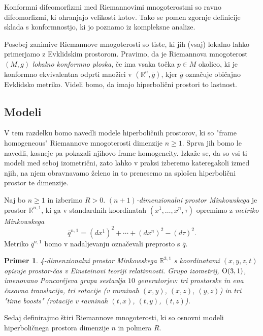 \documentclass[a4paper]{article}
\newtheorem{primer}{Primer}
\begin{document}
Konformni difeomorfizmi med Riemannovimi mnogoterostmi so ravno difeomorfizmi, ki ohranjajo velikosti kotov. Tako se pomen zgornje definicije sklada s konformnostjo, ki jo poznamo iz kompleksne analize.

Posebej zanimive Riemannove mnogoterosti so tiste, ki jih (vsaj) lokalno lahko primerjamo z Evklidskim prostorom. Pravimo, da je Riemannova mnogoterost $(M,g)$ \emph{lokalno konformno ploska}, če ima vsaka točka $p\in M$ okolico, ki je konformno ekvivalentna odprti množici v $(\mathbb{R}^{n}, \bar{g})$, kjer $\bar{g}$ označuje običajno Evklidsko metriko. Videli bomo, da imajo hiperbolični prostori to lastnost.

\subsection{Modeli}

V tem razdelku bomo navedli modele hiperboličnih prostorov, ki so "frame homogeneous" Riemannove mnogoterosti dimenzije $n \geq 1$. Sprva jih bomo le navedli, kasneje pa pokazali njihovo frame homogeneity. Izkaže se, da so vsi ti modeli med seboj izometrični, zato lahko v praksi izberemo kateregakoli izmed njih, na njem obravnavamo želeno in to prenesemo na splošen hiperbolični prostor te dimenzije.

Naj bo $n \geq 1$ in izberimo $R>0$.
\emph{$(n+1)$-dimenzionalni prostor Minkowskega} je prostor $\mathbb{R}^{n,1}$, ki ga v standardnih koordinatah $(x^{1}, \dots , x^{n}, \tau)$ opremimo z \emph{metriko Minkowskega}
\begin{equation}\label{eq:Mink metrika}
\bar{q}^{n,1} = (dx^{1})^2 + \cdots + (dx^{n})^2 - (d\tau)^2.
\end{equation}
Metriko $\bar{q}^{n,1}$ bomo v nadaljevanju označevali preprosto s $\bar{q}$.

\begin{primer}
4-dimenzionalni prostor Minkowskega $\mathbb{R}^{3,1}$ s koordinatami $(x,y,z,t)$ opisuje prostor-čas v Einsteinovi teoriji relativnosti. Grupo izometrij, $\textup{O}(3,1)$, imenovano \emph{Poncar\'ejeva grupa} sestavlja $10$ generatorjev: tri prostorske in ena časovna translacija, tri rotacije (v ravninah $(x,y)$, $(x,z)$, $(y,z)$) in tri "time boosts" (rotacije v ravninah $(t,x)$, $(t,y)$, $(t,z)$).
\end{primer}

Sedaj definirajmo štiri Riemannove mnogoterosti, ki so osnovni modeli hiperboličnega prostora dimenzije $n$ in polmera $R$.
\end{document}
